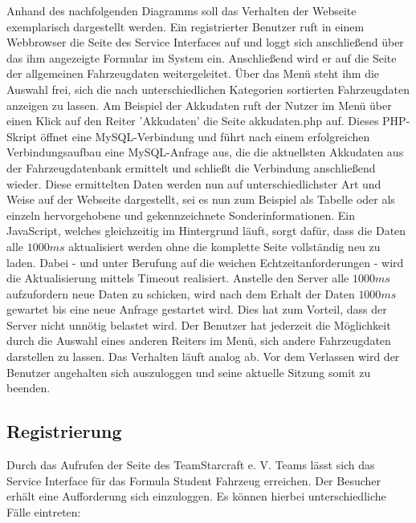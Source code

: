 \documentclass[fontsize = 12pt, paper = a4]{scrreprt}
\begin{document}
Anhand des nachfolgenden Diagramms soll das Verhalten der Webseite exemplarisch dargestellt werden. Ein registrierter Benutzer ruft in einem Webbrowser die Seite des Service Interfaces auf und loggt sich anschließend über das ihm angezeigte Formular im System ein. Anschließend wird er auf die Seite der allgemeinen Fahrzeugdaten weitergeleitet. Über das Menü steht ihm die Auswahl frei, sich die nach unterschiedlichen Kategorien sortierten Fahrzeugdaten anzeigen zu lassen. Am Beispiel der Akkudaten ruft der Nutzer im Menü über einen Klick auf den Reiter 'Akkudaten' die Seite akkudaten.php auf. Dieses PHP-Skript öffnet eine MySQL-Verbindung und führt nach einem erfolgreichen Verbindungsaufbau eine MySQL-Anfrage aus, die die aktuellsten Akkudaten aus der Fahrzeugdatenbank ermittelt und schließt die Verbindung anschließend wieder. Diese ermittelten Daten werden nun auf unterschiedlichster Art und Weise auf der Webseite dargestellt, sei es nun zum Beispiel als Tabelle oder als einzeln hervorgehobene und gekennzeichnete Sonderinformationen.
Ein JavaScript, welches gleichzeitig im Hintergrund läuft, sorgt dafür, dass die Daten alle $1000 ms$ aktualisiert werden ohne die komplette Seite vollständig neu zu laden. Dabei - und unter Berufung auf die weichen Echtzeitanforderungen - wird die Aktualisierung mittels Timeout realisiert. Anstelle den Server alle $1000 ms$ aufzufordern neue Daten zu schicken, wird nach dem Erhalt der Daten $1000 ms$ gewartet bis eine neue Anfrage gestartet wird. Dies hat zum Vorteil, dass der Server nicht unnötig belastet wird.
Der Benutzer hat jederzeit die Möglichkeit durch die Auswahl eines anderen Reiters im Menü, sich andere Fahrzeugdaten darstellen zu lassen. Das Verhalten läuft analog ab. Vor dem Verlassen wird der Benutzer angehalten sich auszuloggen und seine aktuelle Sitzung somit zu beenden.

\subsection{Registrierung}

Durch das Aufrufen der Seite des TeamStarcraft e. V. Teams lässt sich das Service Interface für das Formula Student Fahrzeug erreichen. Der Besucher erhält eine Aufforderung sich einzuloggen. Es können hierbei unterschiedliche Fälle eintreten:
\end{document}
